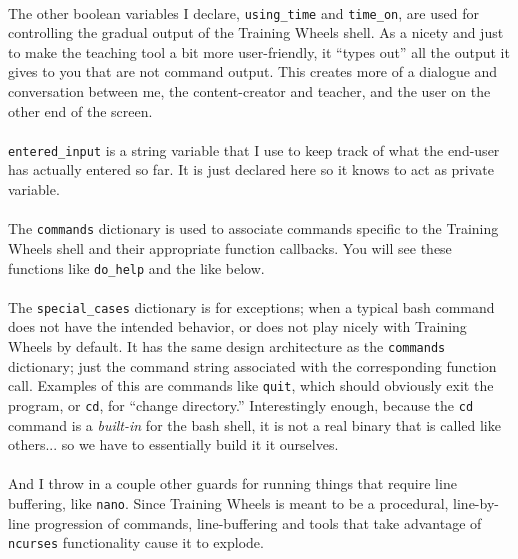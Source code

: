 \documentclass[11pt]{article}
\begin{document}
	\paragraph{} The other boolean variables I declare, \texttt{using\_time} and \texttt{time\_on}, are used for controlling the gradual output of the Training Wheels shell. As a nicety and just to make the teaching tool a bit more user-friendly, it ``types out'' all the output it gives to you that are not command output. This creates more of a dialogue and conversation between me, the content-creator and teacher, and the user on the other end of the screen.

	\paragraph{} \texttt{entered\_input} is a string variable that I use to keep track of what the end-user has actually entered so far. It is just declared here so it knows to act as private variable.

	\paragraph{} The \texttt{commands} dictionary is used to associate commands specific to the Training Wheels shell and their appropriate function callbacks. You will see these functions like \texttt{do\_help} and the like below.

	\paragraph{} The \texttt{special\_cases} dictionary is for exceptions; when a typical bash command does not have the intended behavior, or does not play nicely with Training Wheels by default. It has the same design architecture as the \texttt{commands} dictionary; just the command string associated with the corresponding function call. Examples of this are commands like \texttt{quit}, which should obviously exit the program, or \texttt{cd}, for ``change directory.'' Interestingly enough, because the \texttt{cd} command is a \textit{built-in} for the bash shell, it is not a real binary that is called like others... so we have to essentially build it it ourselves.

	\paragraph{} And I throw in a couple other guards for running things that require line buffering, like \texttt{nano}. Since Training Wheels is meant to be a procedural, line-by-line progression of commands, line-buffering and tools that take advantage of \texttt{ncurses} functionality cause it to explode.
\end{document}
